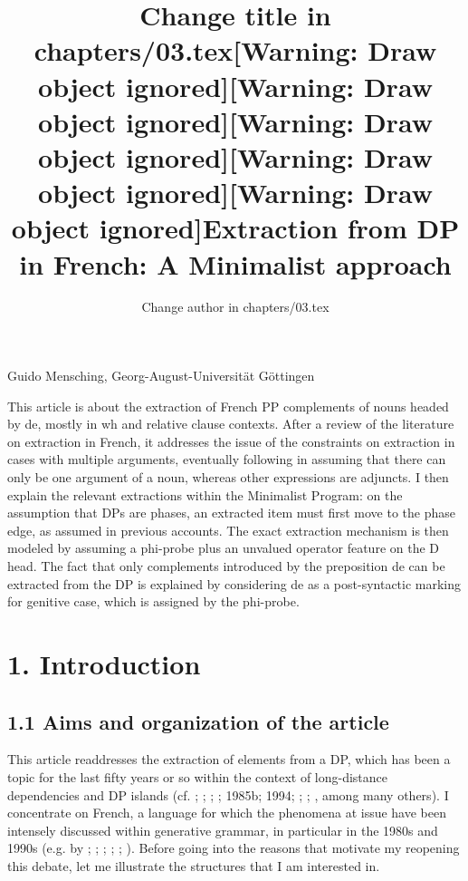 \documentclass[output=paper]{langsci/langscibook}
\author{Change author in chapters/03.tex}
\title{Change title in chapters/03.tex}
\begin{document}
\title{[Warning: Draw object ignored][Warning: Draw object ignored][Warning: Draw object ignored][Warning: Draw object ignored][Warning: Draw object ignored]Extraction from DP in French: A Minimalist approach}

Guido Mensching, Georg-August-Universität Göttingen

\begin{stylelsAbstract}
This article is about the extraction of French PP complements of nouns headed by de, mostly in wh and relative clause contexts. After a review of the literature on extraction in French, it addresses the issue of the constraints on extraction in cases with multiple arguments, eventually following \citet{Kolliakou1999} in assuming that there can only be one argument of a noun, whereas other expressions are adjuncts. I then explain the relevant extractions within the Minimalist Program: on the assumption that DPs are phases, an extracted item must first move to the phase edge, as assumed in previous accounts. The exact extraction mechanism is then modeled by assuming a phi-probe plus an unvalued operator feature on the D head. The fact that only complements introduced by the preposition de can be extracted from the DP is explained by considering de as a post-syntactic marking for genitive case, which is assigned by the phi-probe.
\end{stylelsAbstract}

\section{ 1. Introduction}

\subsection{ 1.1 Aims and organization of the article}

This article readdresses the extraction of elements from a DP, which has been a topic for the last fifty years or so within the context of long-distance dependencies and DP islands (cf. \citealt{Ross1967}; \citealt{Sportiche1981}; \citealt{Huang1982}; \citealt{Obenauer1985a}; 1985b; 1994; \citealt{Chomsky1986}; \citealt{Cinque1990}; \citealt{Szabolcsi2006}, among many others). I concentrate on French, a language for which the phenomena at issue have been intensely discussed within generative grammar, in particular in the 1980s and 1990s (e.g. by \citealt{Tellier1990}; \citealt{Sportiche1981}; \citealt{Obenauer1984}; \citealt{Pollock1989}; \citealt{Valois1991}; \citealt{Godard1992}). Before going into the reasons that motivate my reopening this debate, let me illustrate the structures that I am interested in.
\end{document}
